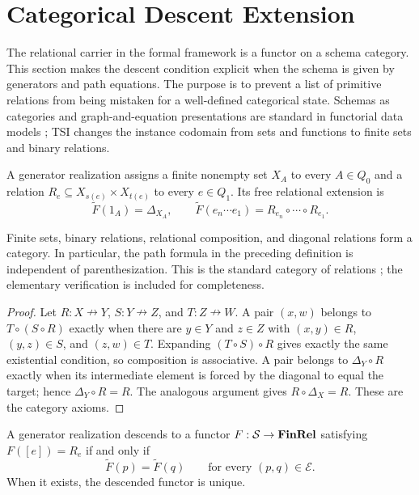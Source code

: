 \section{Categorical Descent Extension}

The relational carrier in the formal framework is a functor on a schema
category. This section makes the descent condition explicit when the schema is
given by generators and path equations. The purpose is to prevent a list of
primitive relations from being mistaken for a well-defined categorical state.
Schemas as categories and graph-and-equation presentations are standard in
functorial data models \cite{spivak2012functorial,
spivakwisnesky2015relational}; TSI changes the instance codomain from sets and
functions to finite sets and binary relations.


\begin{definition}
A generator realization assigns a finite nonempty set $X_A$ to every
$A\in Q_0$ and a relation $R_e\subseteq X_{s(e)}\times X_{t(e)}$ to
every $e\in Q_1$. Its free relational extension is
\[
 \widetilde F(1_A)=\Delta_{X_A},\qquad
 \widetilde F(e_n\cdots e_1)
 =R_{e_n}\circ\cdots\circ R_{e_1}.
\]
\end{definition}

\begin{proposition}
Finite sets, binary relations, relational composition, and diagonal relations
form a category. In particular, the path formula in the preceding definition
is independent of parenthesization. This is the standard category of relations
\cite{freydscedrov1990categories}; the elementary verification is included for
completeness.
\end{proposition}

\begin{proof}
Let $R:X\nrightarrow Y$, $S:Y\nrightarrow Z$, and $T:Z\nrightarrow W$.
A pair $(x,w)$ belongs to $T\circ(S\circ R)$ exactly when there are
$y\in Y$ and $z\in Z$ with
$(x,y)\in R$, $(y,z)\in S$, and $(z,w)\in T$. Expanding
$(T\circ S)\circ R$ gives exactly the same existential condition, so
composition is associative. A pair belongs to $\Delta_Y\circ R$ exactly
when its intermediate element is forced by the diagonal to equal the target;
hence $\Delta_Y\circ R=R$. The analogous argument gives
$R\circ\Delta_X=R$. These are the category axioms.
\end{proof}

\begin{theorem}
A generator realization descends to a functor
$F:\mathcal S\to\mathbf{FinRel}$ satisfying
$F([e])=R_e$ if and only if
\[
 \widetilde F(p)=\widetilde F(q)
 \qquad\text{for every }(p,q)\in\mathcal E.
\]
When it exists, the descended functor is unique.
\end{theorem}

